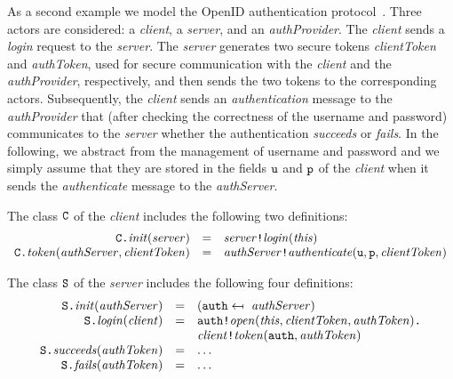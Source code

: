 \documentclass{LMCS}
\theoremstyle{plain}\newtheorem{proposition}[thm]{Proposition}
\theoremstyle{plain}\newtheorem{lemma}[thm]{Lemma}
\theoremstyle{plain}\newtheorem{theorem}[thm]{Theorem}
\theoremstyle{plain}\newtheorem{corollary}[thm]{Corollary}
\newif\ifconf \conffalse
\newcommand{\invk}{\mbox{\tt !}}
\newcommand{\prefix}{\mbox{\tt .}}
\newcommand{\upd}{\mapsfrom~}
\newcommand{\adef}[1]{{\tt #1}}
\begin{document}
\ifconf
\else
\begin{exa}
\newcommand{\username}{{\tt username}}
\newcommand{\password}{{\tt password}}
\newcommand{\auth}{{\tt auth}}
\newcommand{\ctoken}{{\tt ctoken}}
\newcommand{\atoken}{{\tt atoken}}
\newcommand{\server}{{\tt server}}
\newcommand{\sfield}{{\tt server}}
As a second example we model the
OpenID authentication protocol~\cite{openID}.
Three actors are considered: a {\it client}, a {\it server},
and an {\it  authProvider}.
The {\it client} sends a {\it login} request to the {\it server}.
The {\it server} generates two secure tokens {\it clientToken}
and {\it authToken}, used for secure communication with the 
{\it client} and the {\it  authProvider}, respectively,
and then sends the two tokens to the corresponding actors.
Subsequently, the {\it client} sends an {\em authentication}
message to the {\it  authProvider} that (after
checking the correctness of the username and password)
communicates to the {\it server} whether the authentication
{\it succeeds} or {\it fails}.
In the following, we abstract from the management of username
and password and we simply assume that they are stored in the
fields ${\tt u}$ and ${\tt p}$ of the {\it client} 
when it sends the {\it authenticate} message
to the {\it authServer}.

The class ${\adef{C}}$ of the {\it client}
includes the following two definitions:
$$
\begin{array}{rll}
\adef{C} \prefix 
{\it init}({\it server}) & = &
{\it server} \invk {\it login} ({\it this}) \\

\adef{C} \prefix 
{\it token}({\it authServer},{\it clientToken}) & = &
{\it authServer} \invk {\it authenticate} ({\tt u}, {\tt p},{\it clientToken})
\end{array} 
$$

The class ${\adef{S}}$ of the {\it server}
includes the following four definitions:
$$
\begin{array}{rll}
\adef{S} \prefix 
{\it init}({\it authServer}) & = &
(\auth \upd {\it authServer}) 
\\
\adef{S} \prefix 
{\it login}({\it client}) & = &
\auth \invk {\it open} ({\it this},{\it clientToken},{\it authToken}) \prefix \\
& &
{\it client} \invk {\it token} (\auth, {\it authToken})

\\
\adef{S} \prefix 
{\it succeeds}({\it authToken}) & = & \ldots
\\
\adef{S} \prefix 
{\it fails}({\it authToken}) & = & \ldots
\end{array} 
$$


\end{exa}
\end{document}
